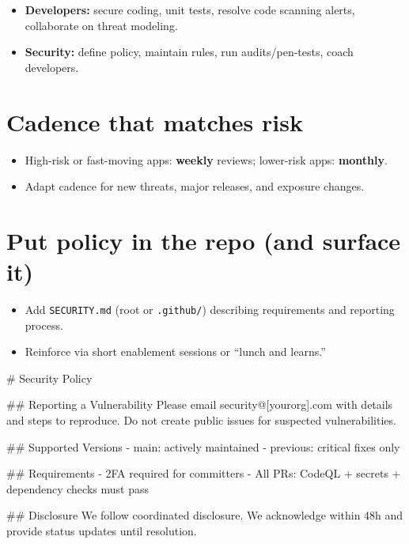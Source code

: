 \documentclass[11pt]{article}
\begin{document}
\begin{itemize}
  \item \textbf{Developers:} secure coding, unit tests, resolve code scanning alerts, collaborate on threat modeling.
  \item \textbf{Security:} define policy, maintain rules, run audits/pen-tests, coach developers.
\end{itemize}

\section{Cadence that matches risk}

\begin{itemize}
  \item High-risk or fast-moving apps: \textbf{weekly} reviews; lower-risk apps: \textbf{monthly}.
  \item Adapt cadence for new threats, major releases, and exposure changes.
\end{itemize}

\section{Put policy in the repo (and surface it)}

\begin{itemize}
  \item Add \texttt{SECURITY.md} (root or \texttt{.github/}) describing requirements and reporting process.
  \item Reinforce via short enablement sessions or ``lunch and learns.''
\end{itemize}

\begin{codelisting}[htbp]
\caption{\texttt{SECURITY.md} starter skeleton}
\begin{textcode}
# Security Policy

## Reporting a Vulnerability
Please email security@[yourorg].com with details and steps to reproduce.
Do not create public issues for suspected vulnerabilities.

## Supported Versions
- main: actively maintained
- previous: critical fixes only

## Requirements
- 2FA required for committers
- All PRs: CodeQL + secrets + dependency checks must pass

## Disclosure
We follow coordinated disclosure. We acknowledge within 48h and provide
status updates until resolution.
\end{textcode}
\end{codelisting}
\end{document}
